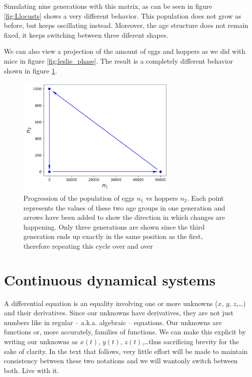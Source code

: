 \documentclass[12pt]{article}
\begin{document}
Simulating nine generations with this matrix, as can be seen in figure \ref{fig:Llocusts} shows a very different behavior. This population does not grow as before, but keeps oscillating instead. Moreover, the age structure does not remain fixed, it keeps switching between three diferent shapes.

We can also view a projection of the amount of eggs and hoppers as we did with mice in figure \ref{fig:leslie_phase}. The result is a completely different behavior shown in figure \ref{fig:leslie_locust_phase}.


\begin{figure}
	\begin{center}
		\includegraphics[width=0.7\textwidth]{locusts_phaseI}	
	\end{center}
	\caption{Progression of the population of eggs $n_1$ vs hoppers $n_2$. Each point represents the values of these two age groups in one generation and arrows have been added to show the direction in which changes are happening. Only three generations are shown since the third generation ends up exactly in the same position as the first, therefore repeating this cycle over and over }
	\label{fig:leslie_locust_phase}
\end{figure}


\FloatBarrier


\section{Continuous dynamical systems}

A differential equation is an equality involving one or more unknowns ($x$, $y$, $z$,\dots) and their derivatives. Since our unknowns have derivatives, they are not just numbers like in regular -- a.k.a. algebraic -- equations. Our unknowns are functions or, more accurately, families of functions. We can make this explicit by writing our unknowns as $x(t)$, $y(t)$, $z(t)$,\dots thus sacrificing brevity for the sake of clarity. In the text that follows, very little effort will be made to maintain consistency between these two notations and we will wantonly switch between both. Live with it.
\end{document}
